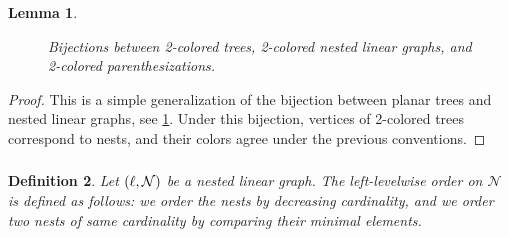 \documentclass[twoside, 12pt]{amsart}
\newtheorem{definition}{Definition}[section]
\newtheorem{lemma}[definition]{Lemma}
\theoremstyle{remark}
\begin{document}
\begin{lemma}
\begin{figure}[h!]
{}
\caption{Bijections between 2-colored trees, 2-colored nested linear graphs, and 2-colored parenthesizations. }
\label{fig:bijections}
\end{figure}
\end{lemma}

\begin{proof}
This is a simple generalization of the bijection between planar trees and nested linear graphs, see \cref{fig:bijections}. 
Under this bijection, vertices of 2-colored trees correspond to nests, and their colors agree under the previous conventions. 
\end{proof}

\subsubsection{}


\begin{definition} \label{def:left-levelwise-graph}
Let $(\ell,\mathcal{N})$ be a nested linear graph. The \emph{left-levelwise order} on $\mathcal{N}$ is defined as follows: we order the nests by decreasing cardinality, and we order two nests of same cardinality by comparing their minimal elements. 
\end{definition}
\end{document}
